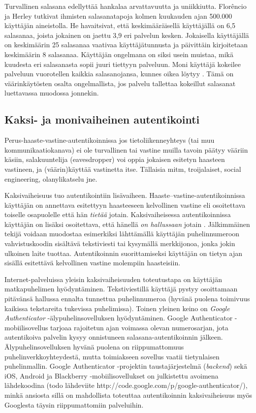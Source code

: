 \documentclass[finnish,gradu]{tktltiki}
\begin{document}
  Turvallinen salasana edellyttää hankalaa arvattavuutta ja uniikkiutta. Florêncio ja Herley \cite{study_of_passwords_07} tutkivat ihmisten salasanatapoja kolmen kuukauden ajan 500.000 käyttäjän aineistolla. He havaitsivat, että keskimääräisellä käyttäjällä on 6,5 salasanaa, joista jokainen on jaettu 3,9 eri palvelun kesken. Jokaisella käyttäjällä on keskimäärin 25 salasanaa vaativaa käyttäjätunnusta ja päivittäin kirjoitetaan keskimäärin 8 salasanaa. Käyttäjän ongelmana on siksi usein muistaa, mikä kuudesta eri salasanasta sopii juuri tiettyyn palveluun. Moni käyttäjä kokeilee palveluun vuorotellen kaikkia salasanojansa, kunnes oikea löytyy \cite{study_of_passwords_07}. Tämä on väärinkäytösten osalta ongelmallista, jos palvelu tallettaa kokeillut salasanat luettavassa muodossa jonnekin.


  \subsection{Kaksi- ja monivaiheinen autentikointi} %
  \label{sub:kaksivaiheinen_autentikointi}

  Perus-haaste-vastine-autentikoinnissa jos tietoliikenneyhteys (tai muu kommunikaatiokanava) ei ole turvallinen tai vastine muilla tavoin päätyy vääriin käsiin, salakuuntelija (eavesdropper) voi oppia jokaisen esitetyn haasteen vastineen, ja (väärin)käyttää vastinetta itse.
  Tällaisia mitm, troijalaiset, social engineering, olanylikatselu jne.

  Kaksivaiheisuus tuo autentikointiin lisävaiheen. Haaste--vastine-autentikoinnissa käyttäjän on annettava esitettyyn haasteeseen kelvollinen vastine eli osoitettava toiselle osapuolelle että hän \emph{tietää} jotain. Kaksivaiheisessa autentikoinnissa käyttäjän on lisäksi osoitettava, että hänellä \emph{on hallussaan} jotain \cite{NIST_SP800-63-1, google_2step_2010}. Jälkimmäinen tekijä voidaan muodostaa esimerkiksi lähttämällä käyttäjän puhelinnumeroon vahvistuskoodin sisältävä tekstiviesti tai kysymällä merkkijonoa, jonka jokin ulkoinen laite tuottaa. Autentikoinnin suorittamiseksi käyttäjän on tietyn ajan sisällä esitettävä kelvollinen vastine molempiin haasteisiin.

  Internet-palveluissa yleisin kaksivaiheisuuden toteutustapa on käyttäjän matkapuhelimen hyödyntäminen. Tekstiviestillä käyttäjä pystyy osoittamaan pitävänsä hallussa ennalta tunnettua puhelinnumeroa (hyvänä puolena toimivuus kaikissa tekstareita tukevissa puhelimissa). Toinen yleinen keino on \emph{Google Authenticator} -älypuhelinsovelluksen hyödyntäminen. Google Authenticator -mobiilisovellus tarjoaa rajoitetun ajan voimassa olevan numerosarjan, jota autentikoiva palvelin kysyy onnistuneen salasana-autentikoinnin jälkeen. Älypuhelinsovelluksen hyvänä puolena on riippumattomuus puhelinverkkoyhteydestä, mutta toimiakseen sovellus vaatii tietynlaisen puhelinmallin. Google Authenticator -projektin taustajärjestelmä (\emph{backend}) sekä iOS, Android ja Blackberry -mobiilisovellukset on julkistettu avoimena lähdekoodina (todo lähdeviite http://code.google.com/p/google-authenticator/), minkä ansiosta sillä on mahdollista toteuttaa autentikoinnin kaksivaiheisuus myös Googlesta täysin riippumattomiin palveluihin.
\end{document}
